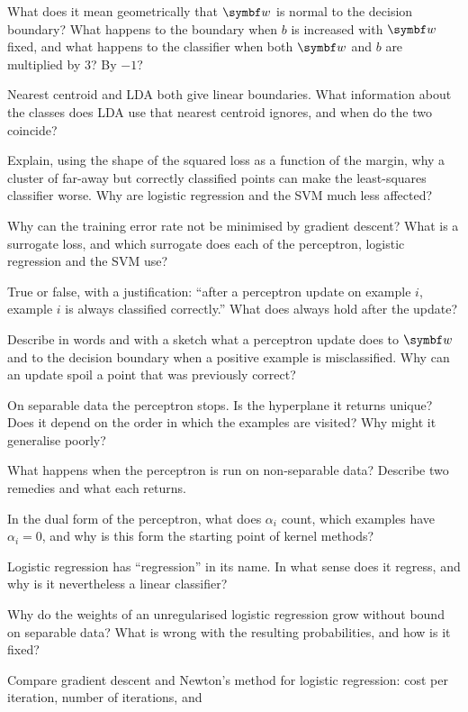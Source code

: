 \documentclass[11pt]{article}
\newcommand{\w}{\vect{w}}
\begin{document}
\begin{questions}
\begin{conceptual}
\item What does it mean geometrically that $\w$ is normal to the decision boundary? What happens to the boundary when $b$
is increased with $\w$ fixed, and what happens to the classifier when both $\w$ and $b$ are multiplied by $3$? By $-1$?
\item Nearest centroid and LDA both give linear boundaries. What information about the classes does LDA use that nearest
centroid ignores, and when do the two coincide?
\item Explain, using the shape of the squared loss as a function of the margin, why a cluster of far-away but correctly
classified points can make the least-squares classifier worse. Why are logistic regression and the SVM much less
affected?
\item Why can the training error rate not be minimised by gradient descent? What is a surrogate loss, and which surrogate
does each of the perceptron, logistic regression and the SVM use?
\item True or false, with a justification: ``after a perceptron update on example $i$, example $i$ is always classified
correctly.'' What does always hold after the update?
\item Describe in words and with a sketch what a perceptron update does to $\w$ and to the decision boundary when a
positive example is misclassified. Why can an update spoil a point that was previously correct?
\item On separable data the perceptron stops. Is the hyperplane it returns unique? Does it depend on the order in which
the examples are visited? Why might it generalise poorly?
\item What happens when the perceptron is run on non-separable data? Describe two remedies and what each returns.
\item In the dual form of the perceptron, what does $\alpha_i$ count, which examples have $\alpha_i = 0$, and why is this
form the starting point of kernel methods?
\item Logistic regression has ``regression'' in its name. In what sense does it regress, and why is it nevertheless a
linear classifier?
\item Why do the weights of an unregularised logistic regression grow without bound on separable data? What is wrong with
the resulting probabilities, and how is it fixed?
\item Compare gradient descent and Newton's method for logistic regression: cost per iteration, number of iterations, and

\end{conceptual}
\end{questions}
\end{document}
